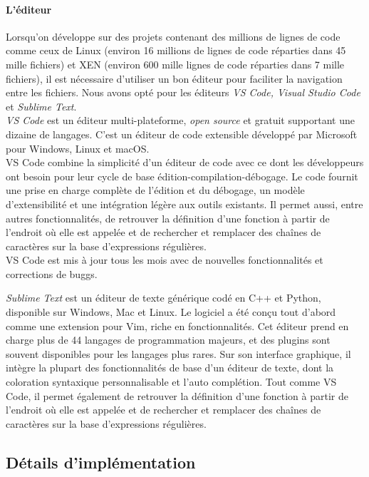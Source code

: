 \paragraph{\textbf{L'éditeur}}
\par\noindent
\par\noindent Lorsqu'on développe sur des projets contenant des millions de lignes de code comme ceux de Linux (environ 16 millions de lignes de code réparties dans 45 mille fichiers) \cite{linux} et XEN (environ 600 mille lignes de code réparties dans 7 mille fichiers), il est nécessaire d'utiliser un bon éditeur pour faciliter la navigation entre les fichiers. Nous avons opté pour les éditeurs \emph{VS Code, Visual Studio Code} et \emph{Sublime Text}.\\

\emph{VS Code} est un éditeur multi-plateforme, \textit{open source} et gratuit supportant une dizaine de langages. C'est un éditeur de code extensible développé par Microsoft pour Windows, Linux et macOS.\\
VS Code combine la simplicité d'un éditeur de code avec ce dont les développeurs ont besoin pour leur cycle de base édition-compilation-débogage. Le code fournit une prise en charge complète de l'édition et du débogage, un modèle d'extensibilité et une intégration légère aux outils existants. Il permet aussi, entre autres fonctionnalités, de retrouver la définition d'une fonction à partir de l'endroit où elle est appelée et de rechercher et remplacer des chaînes de caractères sur la base d'expressions régulières.\\
 VS Code est mis à jour tous les mois avec de nouvelles fonctionnalités et corrections de buggs.

\emph{Sublime Text} est un éditeur de texte générique codé en C++ et Python, disponible sur Windows, Mac et Linux. Le logiciel a été conçu tout d'abord comme une extension pour Vim, riche en fonctionnalités. Cet éditeur prend en charge plus de 44 langages de programmation majeurs, et des plugins sont souvent disponibles pour les langages plus rares. Sur son interface graphique, il intègre la plupart des fonctionnalités de base d'un éditeur de texte, dont la coloration syntaxique personnalisable et l’auto complétion. Tout comme VS Code, il permet également de retrouver la définition d'une fonction à partir de l'endroit où elle est appelée et de rechercher et remplacer des chaînes de caractères sur la base d'expressions régulières.

\subsection{Détails d'implémentation}
